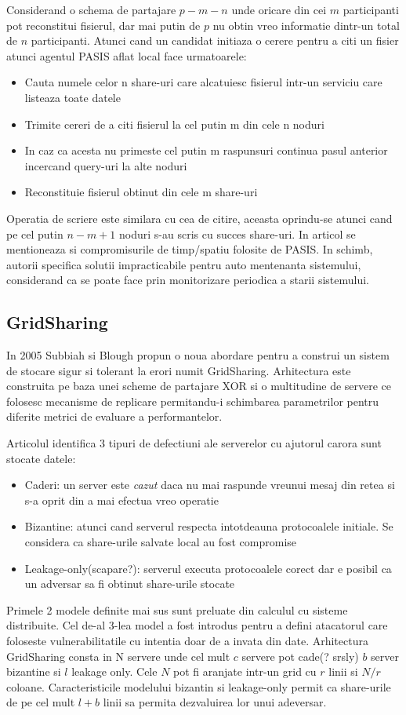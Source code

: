 \documentclass{llncs}
\begin{document}
Considerand o schema de partajare $p-m-n$ unde oricare din cei $m$ participanti pot reconstitui fisierul, dar mai putin de $p$ nu obtin vreo informatie dintr-un total de $n$ participanti. Atunci cand un candidat initiaza o cerere pentru a citi un fisier atunci agentul PASIS aflat local face urmatoarele: 
\begin{itemize}
	\item Cauta numele celor n share-uri care alcatuiesc fisierul intr-un serviciu care listeaza toate datele
	\item Trimite cereri de a citi fisierul la cel putin m din cele n noduri
	\item In caz ca acesta nu primeste cel putin m raspunsuri continua pasul anterior incercand query-uri la alte noduri
	\item Reconstituie fisierul obtinut din cele m share-uri
\end{itemize}
Operatia de scriere este similara cu cea de citire, aceasta oprindu-se atunci cand pe cel putin $n - m + 1$ noduri s-au scris cu succes share-uri.
In articol se mentioneaza si compromisurile de timp/spatiu folosite de PASIS. In schimb, autorii specifica solutii impracticabile pentru auto mentenanta sistemului, considerand ca se poate face prin monitorizare periodica a starii sistemului.

\subsection{GridSharing} 
In 2005 Subbiah si Blough propun o noua abordare pentru a construi un sistem de stocare sigur si tolerant la erori numit GridSharing.
Arhitectura este construita pe baza unei scheme de partajare XOR si o multitudine de servere ce folosesc mecanisme de replicare permitandu-i schimbarea parametrilor pentru diferite metrici de evaluare a performantelor. \cite{SB:2005}

Articolul identifica 3 tipuri de defectiuni ale serverelor cu ajutorul carora sunt stocate datele:
\begin{itemize}
	\item Caderi: un server este \textit{cazut} daca nu mai raspunde vreunui mesaj din retea si s-a oprit din a mai efectua vreo operatie 
	\item Bizantine: atunci cand serverul respecta intotdeauna protocoalele initiale. Se considera ca share-urile salvate local au fost compromise
	\item Leakage-only(scapare?): serverul executa protocoalele corect dar e posibil ca un adversar sa fi obtinut share-urile stocate
\end{itemize}
Primele 2 modele definite mai sus sunt preluate din calculul cu sisteme distribuite. Cel de-al 3-lea model a fost introdus pentru a defini atacatorul care foloseste vulnerabilitatile cu intentia doar de a invata din date. Arhitectura GridSharing consta in N servere unde cel mult $c$ servere pot cade(? srsly) $b$ server bizantine si $l$ leakage only. Cele $N$ pot fi aranjate intr-un grid cu $r$ linii si $N/r$ coloane. Caracteristicile modelului bizantin si leakage-only permit ca share-urile de pe cel mult $l + b$ linii sa permita dezvaluirea lor unui adeversar.  
\end{document}
